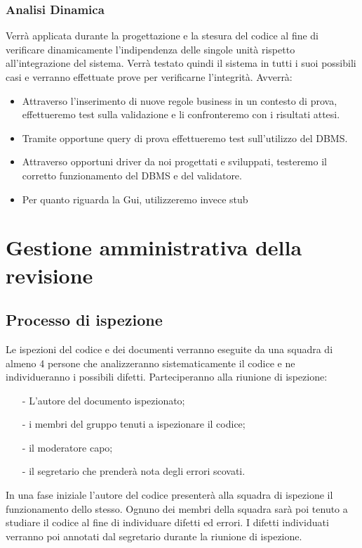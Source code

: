 \documentclass[11pt,titlepage,a4paper]{report}
\begin{document}
\subsection{Analisi Dinamica}
Verr\`a applicata durante la progettazione e la stesura del codice al fine di verificare dinamicamente l'indipendenza delle singole unit\`a rispetto all'integrazione del sistema. Verr\`a testato quindi il sistema in tutti i suoi possibili casi e verranno effettuate prove per verificarne l'integrit\`a. Avverr\`a:
\begin{itemize}
\item Attraverso l'inserimento di nuove regole business in un contesto di prova, effettueremo test sulla validazione e li confronteremo con i risultati attesi.
\item Tramite opportune query di prova effettueremo test sull'utilizzo del DBMS.
\item Attraverso opportuni driver da noi progettati e sviluppati, testeremo il corretto funzionamento del DBMS e del validatore.
\item Per quanto riguarda la Gui, utilizzeremo invece stub 
\end{itemize}

\chapter[Gestione revisione]{Gestione amministrativa della revisione} 
\section{Processo di ispezione}
Le ispezioni del codice e dei documenti verranno eseguite da una squadra di almeno 4 persone che analizzeranno sistematicamente il codice e ne individueranno i possibili difetti. Parteciperanno alla riunione di ispezione: 
\begin{itemize}
\item[-]L'autore del documento ispezionato;
\item[-]i membri del gruppo tenuti a ispezionare il codice;
\item[-]il moderatore capo;
\item[-]il segretario che prender\`a nota degli errori scovati.
\end{itemize}
In una fase iniziale l'autore del codice presenter\`a alla squadra di ispezione il funzionamento dello stesso. Ognuno dei membri della squadra sar\`a poi tenuto a studiare il codice al fine di individuare difetti ed errori. I difetti individuati verranno poi annotati dal segretario durante la riunione di ispezione. 
\end{document}
